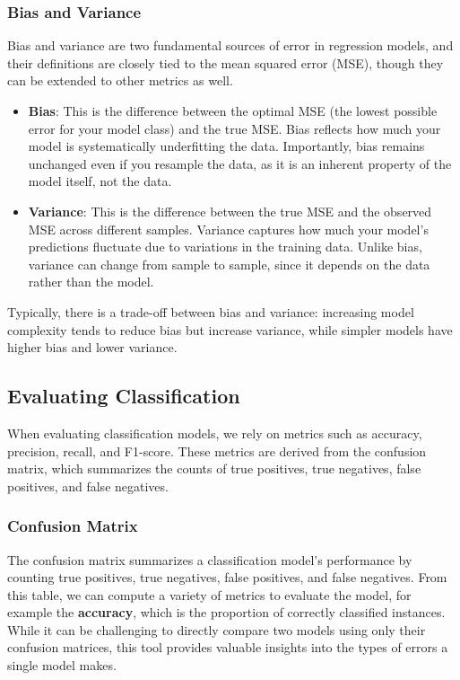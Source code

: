 \subsubsection{Bias and Variance}
Bias and variance are two fundamental sources of error in regression models, and their definitions are closely tied to the mean squared error (MSE), though they can be extended to other metrics as well.
\begin{itemize}
    \item \textbf{Bias}: This is the difference between the optimal MSE (the lowest possible error for your model class) and the true MSE.
    Bias reflects how much your model is systematically underfitting the data.
    Importantly, bias remains unchanged even if you resample the data, as it is an inherent property of the model itself, not the data.
    \item \textbf{Variance}: This is the difference between the true MSE and the observed MSE across different samples.
    Variance captures how much your model's predictions fluctuate due to variations in the training data.
    Unlike bias, variance can change from sample to sample, since it depends on the data rather than the model.
\end{itemize}
Typically, there is a trade-off between bias and variance: increasing model complexity tends to reduce bias but increase variance, while simpler models have higher bias and lower variance.

\subsection{Evaluating Classification}
When evaluating classification models, we rely on metrics such as accuracy, precision, recall, and F1-score. These metrics are derived from the confusion matrix, which summarizes the counts of true positives, true negatives, false positives, and false negatives.

\subsubsection{Confusion Matrix}
The confusion matrix summarizes a classification model's performance by counting true positives, true negatives, false positives, and false negatives.
From this table, we can compute a variety of metrics to evaluate the model, for example the \textbf{accuracy}, which is the proportion of correctly classified instances.
While it can be challenging to directly compare two models using only their confusion matrices, this tool provides valuable insights into the types of errors a single model makes.

